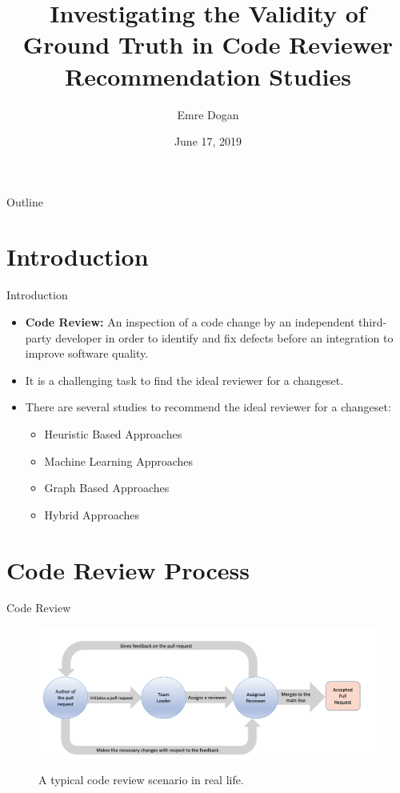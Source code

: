 \documentclass{beamer}
\title[Investigating the Validity of Ground Truth in Code Reviewer Recommendation Studies]{Investigating the Validity of Ground Truth in Code Reviewer Recommendation Studies}
\author{Emre Dogan}
\institute{Bilkent University}
\date{June 17, 2019}
\begin{document}
\begin{frame}
  \titlepage
\end{frame}

\begin{frame}{Outline}
  \tableofcontents
\end{frame}
%
%


\section{Introduction}

\begin{frame}{Introduction}

\begin{itemize}
  \item \textbf{Code Review:} An inspection of a code change by an independent third-party
developer in order to identify and fix defects before an integration to
improve software quality\cite{whoshould}.
  \item It is a challenging task to find the ideal reviewer for a changeset.
  \item There are several studies to recommend the ideal reviewer for a changeset:
  \begin{itemize}
      \item Heuristic Based  Approaches
      \item Machine Learning Approaches
      \item Graph Based Approaches
      \item Hybrid Approaches
  \end{itemize}
\end{itemize}

\vskip 1cm
\end{frame}
%
%
\section{Code Review Process}
\begin{frame}{Code Review}
    \begin{figure}
    \includegraphics[width=\textwidth]{review.png}
    \caption{\label{fig:your-figure}A typical code review scenario in real life.}
    \end{figure}
\end{frame}
\end{document}
